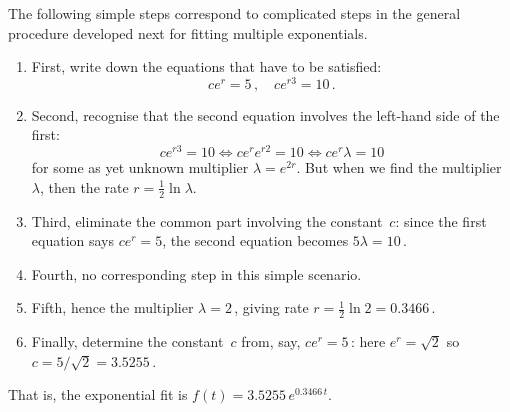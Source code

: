 \begin{draft}
\begin{example}
\begin{solution}
The following simple steps correspond to complicated steps in the general procedure developed next for fitting multiple exponentials.
\begin{enumerate}
\item First, write down the equations that have to be satisfied:
\begin{equation*}
ce^{r}=5\,,\quad ce^{r3}=10\,.
\end{equation*}
\item Second, recognise that the second equation involves the left-hand side of the first:
\begin{equation*}
ce^{r3}=10 \iff ce^re^{r2}=10\iff ce^r\lambda=10
\end{equation*}
for some as yet unknown multiplier \(\lambda=e^{2r}\).
But when we find the multiplier~\(\lambda\), then the rate \(r=\tfrac12\ln\lambda\).
\item Third, eliminate the common part involving the constant~\(c\): since the first equation says \(ce^r=5\), the second equation becomes \(5\lambda=10\)\,.
\item Fourth, no corresponding step in this simple scenario.
\item Fifth, hence the multiplier \(\lambda=2\)\,, giving rate \(r=\tfrac12\ln 2=0.3466\)\,.
\item Finally, determine the constant~\(c\) from, say, \(ce^r=5\)\,:
here \(e^r=\sqrt2\) so \(c=5/\sqrt2=3.5255\)\,.
\end{enumerate}
That is, the exponential fit is \(f(t)=3.5255\,e^{0.3466\,t}\).
\end{solution}
\end{example}








\end{draft}
